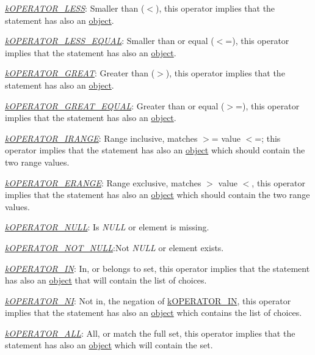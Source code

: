 \begin{DoxyItemize}
\begin{DoxyItemize}
\item {\itshape \hyperlink{}{k\-O\-P\-E\-R\-A\-T\-O\-R\-\_\-\-L\-E\-S\-S}}\-: Smaller than ($<$), this operator implies that the statement has also an \hyperlink{}{object}. 
\item {\itshape \hyperlink{}{k\-O\-P\-E\-R\-A\-T\-O\-R\-\_\-\-L\-E\-S\-S\-\_\-\-E\-Q\-U\-A\-L}}\-: Smaller than or equal ($<$=), this operator implies that the statement has also an \hyperlink{}{object}. 
\item {\itshape \hyperlink{}{k\-O\-P\-E\-R\-A\-T\-O\-R\-\_\-\-G\-R\-E\-A\-T}}\-: Greater than ($>$), this operator implies that the statement has also an \hyperlink{}{object}. 
\item {\itshape \hyperlink{}{k\-O\-P\-E\-R\-A\-T\-O\-R\-\_\-\-G\-R\-E\-A\-T\-\_\-\-E\-Q\-U\-A\-L}}\-: Greater than or equal ($>$=), this operator implies that the statement has also an \hyperlink{}{object}. 
\item {\itshape \hyperlink{}{k\-O\-P\-E\-R\-A\-T\-O\-R\-\_\-\-I\-R\-A\-N\-G\-E}}\-: Range inclusive, matches $>$= value $<$=; this operator implies that the statement has also an \hyperlink{}{object} which should contain the two range values. 
\item {\itshape \hyperlink{}{k\-O\-P\-E\-R\-A\-T\-O\-R\-\_\-\-E\-R\-A\-N\-G\-E}}\-: Range exclusive, matches $>$ value $<$, this operator implies that the statement has also an \hyperlink{}{object} which should contain the two range values. 
\item {\itshape \hyperlink{}{k\-O\-P\-E\-R\-A\-T\-O\-R\-\_\-\-N\-U\-L\-L}}\-: Is {\itshape N\-U\-L\-L} or element is missing. 
\item {\itshape \hyperlink{}{k\-O\-P\-E\-R\-A\-T\-O\-R\-\_\-\-N\-O\-T\-\_\-\-N\-U\-L\-L}}\-:Not {\itshape N\-U\-L\-L} or element exists. 
\item {\itshape \hyperlink{}{k\-O\-P\-E\-R\-A\-T\-O\-R\-\_\-\-I\-N}}\-: In, or belongs to set, this operator implies that the statement has also an \hyperlink{}{object} that will contain the list of choices. 
\item {\itshape \hyperlink{}{k\-O\-P\-E\-R\-A\-T\-O\-R\-\_\-\-N\-I}}\-: Not in, the negation of \hyperlink{}{k\-O\-P\-E\-R\-A\-T\-O\-R\-\_\-\-I\-N}, this operator implies that the statement has also an \hyperlink{}{object} which contains the list of choices. 
\item {\itshape \hyperlink{}{k\-O\-P\-E\-R\-A\-T\-O\-R\-\_\-\-A\-L\-L}}\-: All, or match the full set, this operator implies that the statement has also an \hyperlink{}{object} which will contain the set. 

\end{DoxyItemize}
\end{DoxyItemize}

